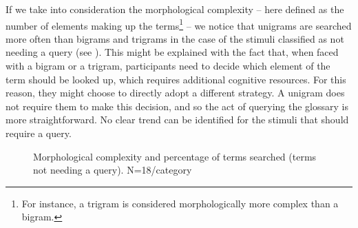 \documentclass[output=paper]{langsci/langscibook}
\begin{document}
If we take into consideration the morphological complexity -- here defined as the number of elements making up the terms\footnote{For instance, a trigram is considered morphologically more complex than a bigram.} --  we notice that unigrams are searched more often than bigrams and trigrams in the case of the stimuli classified as not needing a query (see ). This might be explained with the fact that, when faced with a bigram or a trigram, participants need to decide which element of the term should be looked up, which requires additional cognitive resources. For this reason, they might choose to directly adopt a different strategy. A unigram does not require them to make this decision, and so the act of querying the glossary is more straightforward. No clear trend can be identified for the stimuli that should require a query.

\begin{figure}
\caption{Morphological complexity and percentage of terms searched (terms not needing a query). N=18/category \label{fig:prandi:11}}
\end{figure}
\end{document}
